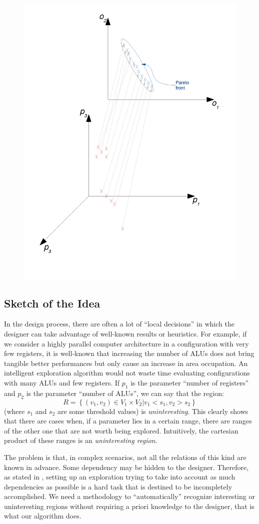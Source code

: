 \begin{figure}[t]
\center
\includegraphics[width=0.5\columnwidth]{img/Pareto_set_and_front}
\end{figure}

\subsection{Sketch of the Idea}

In the design process, there are often a lot of ``local decisions'' in
which the designer can take advantage of well-known results or
heuristics. For example, if we consider a highly parallel
computer architecture in a configuration with very few registers, it is
well-known that increasing the number of ALUs does not bring tangible
better performances but only cause an increase in area occupation. An
intelligent exploration algorithm would not waste time evaluating
configurations with many ALUs and few registers. If $p_{1}$ is the
parameter ``number of registers'' and $p_{2}$ is the parameter
``number of ALUs'', we can say that the region:
\[
R=\left\{ \left.\left(v_{1},v_{2}\right)\in V_{1}\times V_{2}\right|v_{1}<s_{1},v_{2}>s_{2}\right\} 
\]
 (where $s_{1}$ and $s_{2}$ are some threshold values) is \emph{uninteresting}. This clearly shows that there are cases when, if a parameter lies in
a certain range, there are ranges of the other one that are not worth being explored. Intuitively, the cartesian product of these ranges is an \emph{uninteresting region}.

The problem is that, in complex scenarios, not all the relations of this
kind are known in advance. Some dependency may be hidden
to the designer.
Therefore, as stated in ,
setting up an exploration trying to take into account as much dependencies
as possible is a hard task that is destined to be incompletely
accomplished. We need a methodology to ``automatically'' recognize
interesting or uninteresting regions without requiring a priori knowledge
to the designer, that is what our algorithm does.

